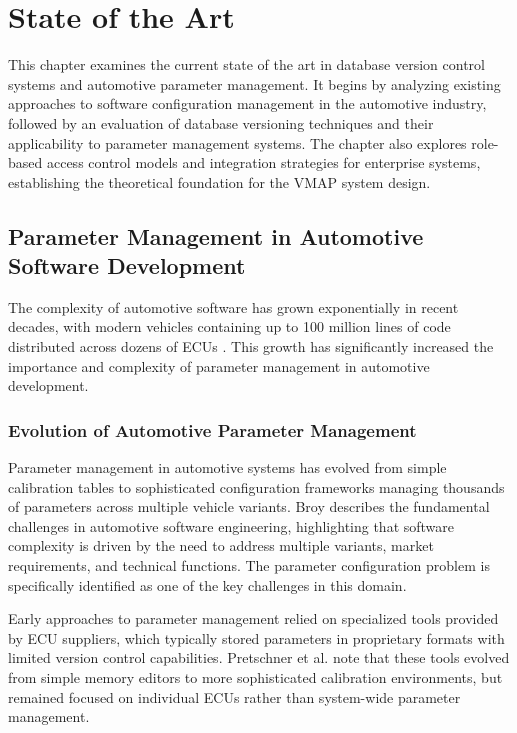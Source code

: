 \chapter{State of the Art}
\label{chap:state-of-art}

This chapter examines the current state of the art in database version control systems and automotive parameter management. It begins by analyzing existing approaches to software configuration management in the automotive industry, followed by an evaluation of database versioning techniques and their applicability to parameter management systems. The chapter also explores role-based access control models and integration strategies for enterprise systems, establishing the theoretical foundation for the \ac{VMAP} system design.

\section{Parameter Management in Automotive Software Development}
\label{sec:parameter-management}

The complexity of automotive software has grown exponentially in recent decades, with modern vehicles containing up to 100 million lines of code distributed across dozens of \acp{ECU} \cite{pretschner2007software}. This growth has significantly increased the importance and complexity of parameter management in automotive development.

\subsection{Evolution of Automotive Parameter Management}
\label{subsec:evolution-parameter-management}

Parameter management in automotive systems has evolved from simple calibration tables to sophisticated configuration frameworks managing thousands of parameters across multiple vehicle variants. Broy \cite{broy2006challenges} describes the fundamental challenges in automotive software engineering, highlighting that software complexity is driven by the need to address multiple variants, market requirements, and technical functions. The parameter configuration problem is specifically identified as one of the key challenges in this domain.

Early approaches to parameter management relied on specialized tools provided by \ac{ECU} suppliers, which typically stored parameters in proprietary formats with limited version control capabilities. Pretschner et al. \cite{pretschner2007software} note that these tools evolved from simple memory editors to more sophisticated calibration environments, but remained focused on individual \acp{ECU} rather than system-wide parameter management.

